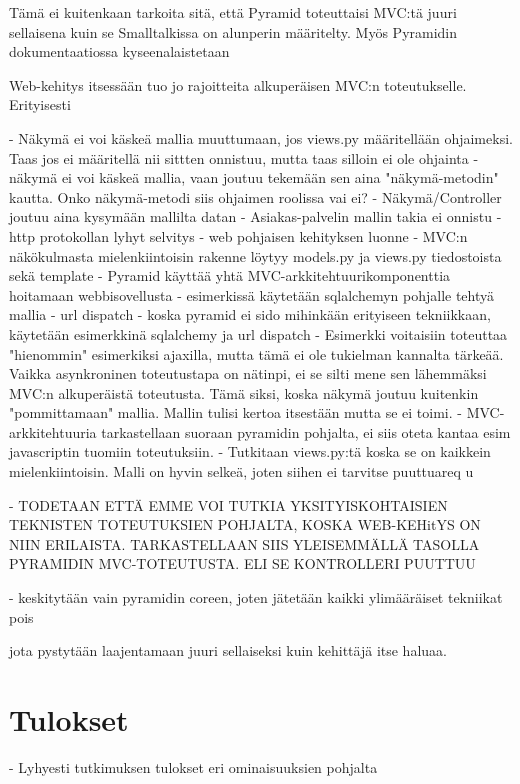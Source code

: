 \documentclass[finnish,utf8,nonumbib,palatino,kandi]{gradu2}
\begin{document}
Tämä ei kuitenkaan tarkoita sitä, että Pyramid toteuttaisi MVC:tä juuri sellaisena kuin se Smalltalkissa on alunperin määritelty. Myös
Pyramidin dokumentaatiossa kyseenalaistetaan 




 Web-kehitys
itsessään tuo jo rajoitteita alkuperäisen MVC:n toteutukselle. Erityisesti 

- Näkymä ei voi käskeä mallia muuttumaan, jos views.py määritellään ohjaimeksi. Taas jos ei määritellä nii sittten onnistuu, mutta taas silloin ei ole ohjainta
- näkymä ei voi käskeä mallia, vaan joutuu tekemään sen aina "näkymä-metodin" kautta. Onko näkymä-metodi siis ohjaimen roolissa vai ei?
- Näkymä/Controller joutuu aina kysymään mallilta datan
- Asiakas-palvelin mallin takia ei onnistu
- http protokollan lyhyt selvitys
- web pohjaisen kehityksen luonne
- MVC:n näkökulmasta mielenkiintoisin rakenne löytyy models.py ja views.py tiedostoista sekä template
- Pyramid käyttää yhtä MVC-arkkitehtuurikomponenttia hoitamaan webbisovellusta
- esimerkissä käytetään sqlalchemyn pohjalle tehtyä mallia
- url dispatch
- koska pyramid ei sido mihinkään erityiseen tekniikkaan, käytetään esimerkkinä sqlalchemy ja url dispatch
- Esimerkki voitaisiin toteuttaa "hienommin" esimerkiksi ajaxilla, mutta tämä ei ole tukielman kannalta tärkeää. Vaikka
asynkroninen toteutustapa on nätinpi, ei se silti mene sen lähemmäksi MVC:n alkuperäistä toteutusta. Tämä siksi,
koska näkymä joutuu kuitenkin "pommittamaan" mallia. Mallin tulisi kertoa itsestään mutta se ei toimi.
- MVC-arkkitehtuuria tarkastellaan suoraan pyramidin pohjalta, ei siis oteta kantaa esim javascriptin tuomiin 
toteutuksiin.
- Tutkitaan views.py:tä koska se on kaikkein mielenkiintoisin. Malli on hyvin selkeä, joten siihen ei tarvitse puuttuareq	u

- TODETAAN ETTÄ EMME VOI TUTKIA YKSITYISKOHTAISIEN TEKNISTEN TOTEUTUKSIEN POHJALTA, KOSKA WEB-KEHitYS ON NIIN ERILAISTA. TARKASTELLAAN
SIIS YLEISEMMÄLLÄ TASOLLA PYRAMIDIN MVC-TOTEUTUSTA. ELI SE KONTROLLERI PUUTTUU

- keskitytään vain pyramidin coreen, joten jätetään kaikki ylimääräiset tekniikat pois


 jota pystytään laajentamaan juuri sellaiseksi
kuin kehittäjä itse haluaa. 



\section{Tulokset}
- Lyhyesti tutkimuksen tulokset eri ominaisuuksien pohjalta
\end{document}
